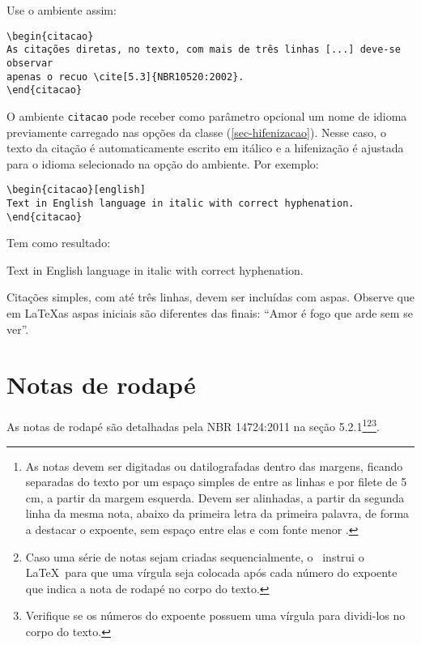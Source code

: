 Use o ambiente assim:

\begin{verbatim}
\begin{citacao}
As citações diretas, no texto, com mais de três linhas [...] deve-se observar
apenas o recuo \cite[5.3]{NBR10520:2002}.
\end{citacao}
\end{verbatim}

O ambiente \texttt{citacao} pode receber como parâmetro opcional um nome de
idioma previamente carregado nas opções da classe (\autoref{sec-hifenizacao}). Nesse
caso, o texto da citação é automaticamente escrito em itálico e a hifenização é
ajustada para o idioma selecionado na opção do ambiente. Por exemplo:

\begin{verbatim}
\begin{citacao}[english]
Text in English language in italic with correct hyphenation.
\end{citacao}
\end{verbatim}

Tem como resultado:

\begin{citacao}[english]
  Text in English language in italic with correct hyphenation.
\end{citacao}

Citações simples, com até três linhas, devem ser
incluídas com aspas. Observe que em \LaTeX as aspas iniciais são diferentes das
finais: ``Amor é fogo que arde sem se ver''.

\section{Notas de rodapé}

As notas de rodapé são detalhadas pela NBR 14724:2011 na seção 5.2.1\footnote{As
  notas devem ser digitadas ou datilografadas dentro das margens, ficando
  separadas do texto por um espaço simples de entre as linhas e por filete de 5
  cm, a partir da margem esquerda. Devem ser alinhadas, a partir da segunda linha
  da mesma nota, abaixo da primeira letra da primeira palavra, de forma a destacar
  o expoente, sem espaço entre elas e com fonte menor
  .}\footnote{Caso uma série de notas sejam
  criadas sequencialmente, o \abnTeX\ instrui o \LaTeX\ para que uma vírgula seja
  colocada após cada número do expoente que indica a nota de rodapé no corpo do
  texto.}\footnote{Verifique se os números do expoente possuem uma vírgula para
  dividi-los no corpo do texto.}.


